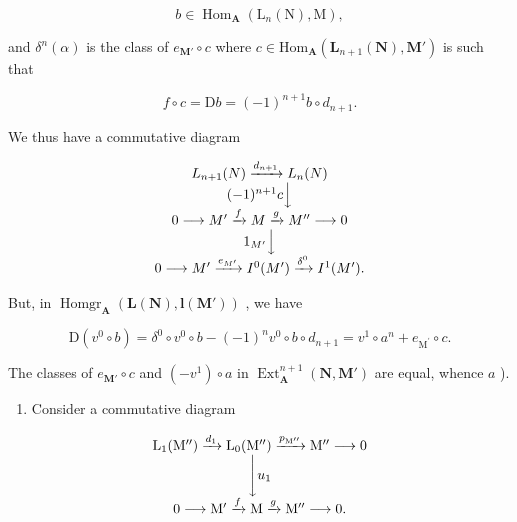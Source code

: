 \[
b \in \operatorname{Hom} _ {\mathbf {A}} \left(\mathrm{L} _ {n} (\mathrm{N}), \mathrm{M}\right),
\]

and \(\delta^n (\alpha)\) is the class of \(e_{\mathbf{M}'}\circ c\) where \(c\in \mathrm{Hom}_{\mathbf{A}}\left(\mathbf{L}_{n + 1}(\mathbf{N}),\mathbf{M}'\right)\) is such that

\[
f \circ c = \mathrm{D} b = (- 1) ^ {n + 1} b \circ d _ {n + 1}.
\]

We thus have a commutative diagram

\[
\begin{array}{c} L _ {n + 1} (N) \xrightarrow {d _ {n + 1}} L _ {n} (N) \\ (- 1) ^ {n + 1} c \Big \downarrow \\ 0 \longrightarrow M ^ {\prime} \xrightarrow {f} M \xrightarrow {g} M ^ {\prime \prime} \longrightarrow 0 \\ 1 _ {M ^ {\prime}} \Big \downarrow \\ 0 \longrightarrow M ^ {\prime} \xrightarrow {e _ {M ^ {\prime}}} I ^ {0} (M ^ {\prime}) \xrightarrow {\delta^ {0}} I ^ {1} (M ^ {\prime}). \end{array}
\]

But, in \(\operatorname{Homgr}_{\mathbf{A}}(\mathbf{L}(\mathbf{N}), \mathbf{l}(\mathbf{M}'))\) , we have

\[
\mathrm{D} \left(v ^ {0} \circ b\right) = \delta^ {0} \circ v ^ {0} \circ b - (- 1) ^ {n} v ^ {0} \circ b \circ d _ {n + 1} = v ^ {1} \circ a ^ {n} + e _ {\mathrm{M} ^ {\prime}} \circ c.
\]

The classes of \(e_{\mathbf{M}'} \circ c\) and \((-v^1) \circ a\) in \(\operatorname{Ext}_{\mathbf{A}}^{n+1}(\mathbf{N}, \mathbf{M}')\) are equal, whence \(a\) ).

\begin{enumerate}
\def\labelenumi{\alph{enumi})}
\setcounter{enumi}{1}
\tightlist
\item
  Consider a commutative diagram
\end{enumerate}

\[
\begin{array}{c} \mathrm{L} _ {1} (\mathrm{M} ^ {\prime \prime}) \xrightarrow {d _ {1}} \mathrm{L} _ {0} (\mathrm{M} ^ {\prime \prime}) \xrightarrow {p _ {\mathrm{M} ^ {\prime \prime}}} \mathrm{M} ^ {\prime \prime} \longrightarrow 0 \\ \Biggl \downarrow u _ {1} \\ 0 \longrightarrow \mathrm{M} ^ {\prime} \xrightarrow {f} \mathrm{M} \xrightarrow {g} \mathrm{M} ^ {\prime \prime} \longrightarrow 0. \end{array}
\]

